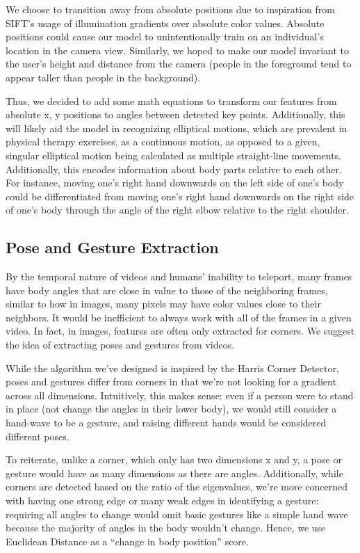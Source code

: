 \indent We choose to transition away from absolute positions due to inspiration from SIFT’s usage of illumination gradients over 
absolute color values. Absolute positions could cause our model to unintentionally train on an individual's location in the 
camera view. Similarly, we hoped to make our model invariant to the user’s height and distance from the camera 
(people in the foreground tend to appear taller than people in the background). 

\indent Thus, we decided to add some math equations to transform our features from absolute x, y positions to angles between detected 
key points. Additionally, this will likely aid the model in recognizing elliptical motions, which are prevalent in physical 
therapy exercises, as a continuous motion, as opposed to a given, singular elliptical motion being calculated as multiple 
straight-line movements. Additionally, this encodes information about body parts relative to each other. For 
instance, moving one’s right hand downwards on the left side of one’s body could be differentiated from moving 
one’s right hand downwards on the right side of one’s body through the angle of the right elbow relative to 
the right shoulder.

\subsection{Pose and Gesture Extraction}
\indent By the temporal nature of videos and humans’ inability to teleport, many frames have body angles that are 
close in value to those of the neighboring frames, similar to how in images, many pixels may have color 
values close to their neighbors. It would be inefficient to always work with all of the frames in a given 
video. In fact, in images, features are often only extracted for corners. We suggest the idea of extracting 
poses and gestures from videos.

\indent While the algorithm we’ve designed is inspired by the Harris Corner Detector, poses and gestures differ from 
corners in that we’re not looking for a gradient across all dimensions. Intuitively, this makes sense: even 
if a person were to stand in place (not change the angles in their lower body), we would still consider a 
hand-wave to be a gesture, and raising different hands would be considered different poses. 

\indent To reiterate, unlike a corner, which only has two dimensions x and y, a pose or gesture would have as many 
dimensions as there are angles. Additionally, while corners are detected based on the ratio of the 
eigenvalues, we’re more concerned with having one strong edge or many weak edges in identifying a gesture: 
requiring all angles to change would omit basic gestures like a simple hand wave because the majority of 
angles in the body wouldn’t change. Hence, we use Euclidean Distance as a “change in body position” score.

